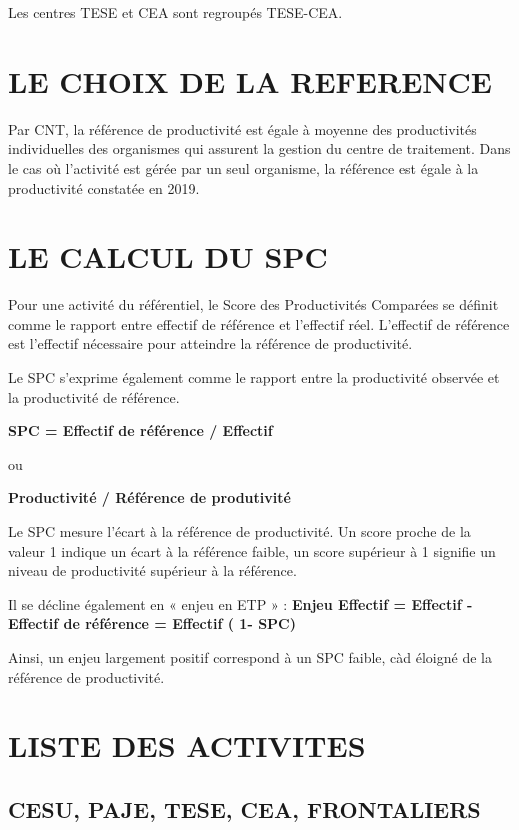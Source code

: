 \documentclass[
]{book}
\begin{document}
Les centres TESE et CEA sont regroupés TESE-CEA.

\hypertarget{le-choix-de-la-reference-7}{%
\section{LE CHOIX DE LA REFERENCE}\label{le-choix-de-la-reference-7}}

Par CNT, la référence de productivité est égale à moyenne des productivités individuelles des organismes qui assurent la gestion du centre de traitement.
Dans le cas où l'activité est gérée par un seul organisme, la référence est égale à la productivité constatée en 2019.

\hypertarget{le-calcul-du-spc-9}{%
\section{LE CALCUL DU SPC}\label{le-calcul-du-spc-9}}

Pour une activité du référentiel, le Score des Productivités Comparées se définit comme le rapport entre effectif de référence et l'effectif réel. L'effectif de référence est l'effectif nécessaire pour atteindre la référence de productivité.

Le SPC s'exprime également comme le rapport entre la productivité observée et la productivité de référence.

\textbf{SPC = Effectif de référence / Effectif}

ou

\textbf{Productivité / Référence de produtivité}

Le SPC mesure l'écart à la référence de productivité. Un score proche de la valeur 1 indique un écart à la référence faible, un score supérieur à 1 signifie un niveau de productivité supérieur à la référence.

Il se décline également en « enjeu en ETP » :
\textbf{Enjeu Effectif = Effectif - Effectif de référence = Effectif ( 1- SPC)}

Ainsi, un enjeu largement positif correspond à un SPC faible, càd éloigné de la référence de productivité.

\hypertarget{liste-des-activites-6}{%
\section{LISTE DES ACTIVITES}\label{liste-des-activites-6}}

\hypertarget{cesu-paje-tese-cea-frontaliers}{%
\subsection{CESU, PAJE, TESE, CEA, FRONTALIERS}\label{cesu-paje-tese-cea-frontaliers}}
\end{document}

